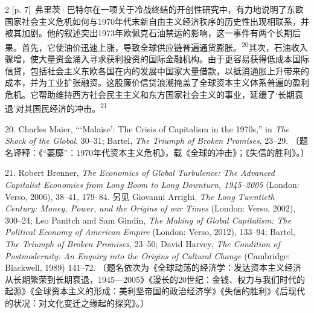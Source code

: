 \documentclass[10pt,a4paper]{article}
\begin{document}
\begin{paracol}{2}
{\scriptsize\color{gray} [p. 7]}\ 弗里茨·巴特尔在一项关于冷战终结的开创性研究中，有力地说明了东欧国家社会主义危机如何与1970年代末新自由主义经济秩序的历史性出现相联系，并被其加剧。他的叙述突出1973年欧佩克石油禁运的影响，这一事件有两个长期后果。首先，它使油价迅速上涨，导致全球供应链普遍通货膨\mbox{胀。\textsuperscript{20}}其次，石油收入骤增，使大量资金涌入寻求获利投资的国际金融机构。由于更容易获得低成本国际信贷，包括社会主义东欧各国在内的发展中国家大量借款，以抵消通胀上升带来的成本，并为工业扩张融资。这股廉价信贷浪潮掩盖了全球资本主义体系普遍的盈利危机。它帮助维持西方社会民主主义和东方国家社会主义的事业，延缓了‘长期衰退’对其国民经济的冲\mbox{击。\textsuperscript{21}}\par{\small 20. Charles Maier, “‘Malaise’: The Crisis of Capitalism in the 1970s,” in \textit{The Shock of the Global}, 30–31; Bartel, \textit{The Triumph of Broken Promises}, 23–29. 〔题名译释：《“萎靡”：1970年代资本主义危机》，载《全球的冲击》；《失信的胜利》。〕\par}{\small 21. Robert Brenner, \textit{The Economics of Global Turbulence: The Advanced Capitalist Economies from Long Boom to Long Downturn, 1945–2005} (London: Verso, 2006), 38–41, 179–84. 另见 Giovanni Arrighi, \textit{The Long Twentieth Century: Money, Power, and the Origins of our Times} (London: Verso, 2002), 300–24; Leo Panitch and Sam Gindin, \textit{The Making of Global Capitalism: The Political Economy of American Empire} (London: Verso, 2012), 133–94; Bartel, \textit{The Triumph of Broken Promises}, 23–50; David Harvey, \textit{The Condition of Postmodernity: An Enquiry into the Origins of Cultural Change} (Cambridge: Blackwell, 1989) 141–72. 〔题名依次为《全球动荡的经济学：发达资本主义经济从长期繁荣到长期衰退，1945—2005》《漫长的20世纪：金钱、权力与我们时代的起源》《全球资本主义的形成：美利坚帝国的政治经济学》《失信的胜利》《后现代的状况：对文化变迁之缘起的探究》。〕\par}
\switchcolumn

\end{paracol}
\end{document}
